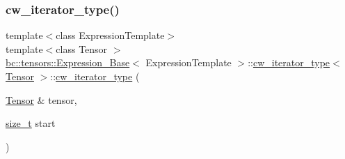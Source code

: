 \subsubsection{\texorpdfstring{cw\+\_\+iterator\+\_\+type()}{cw\_iterator\_type()}\hspace{0.1cm}{\footnotesize\ttfamily [2/3]}}
{\footnotesize\ttfamily template$<$class Expression\+Template$>$ \\
template$<$class Tensor $>$ \\
\hyperlink{classbc_1_1tensors_1_1Expression__Base}{bc\+::tensors\+::\+Expression\+\_\+\+Base}$<$ Expression\+Template $>$\+::\hyperlink{structbc_1_1tensors_1_1Expression__Base_1_1cw__iterator__type}{cw\+\_\+iterator\+\_\+type}$<$ \hyperlink{namespacebc_a659391e47ab612be3ba6c18cf9c89159}{Tensor} $>$\+::\hyperlink{structbc_1_1tensors_1_1Expression__Base_1_1cw__iterator__type}{cw\+\_\+iterator\+\_\+type} (\begin{DoxyParamCaption}\item[{\hyperlink{namespacebc_a659391e47ab612be3ba6c18cf9c89159}{Tensor} \&}]{tensor,  }\item[{\hyperlink{structbc_1_1tensors_1_1Expression__Base_1_1cw__iterator__type_a1423458dda5ab2bd7c7ade4f69fbf081}{size\+\_\+t}}]{start }\end{DoxyParamCaption})\hspace{0.3cm}{\ttfamily [inline]}}

\mbox{\label{structbc_1_1tensors_1_1Expression__Base_1_1cw__iterator__type_a9e5529e64ebd1d2ebe4f6e6702d26855}} 
